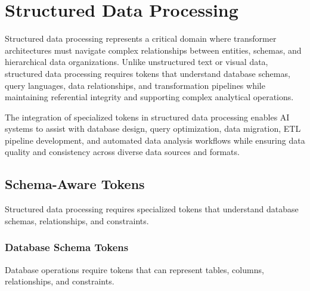 
\section{Structured Data Processing}

Structured data processing represents a critical domain where transformer architectures must navigate complex relationships between entities, schemas, and hierarchical data organizations. Unlike unstructured text or visual data, structured data processing requires tokens that understand database schemas, query languages, data relationships, and transformation pipelines while maintaining referential integrity and supporting complex analytical operations.

The integration of specialized tokens in structured data processing enables AI systems to assist with database design, query optimization, data migration, ETL pipeline development, and automated data analysis workflows while ensuring data quality and consistency across diverse data sources and formats.

\subsection{Schema-Aware Tokens}

Structured data processing requires specialized tokens that understand database schemas, relationships, and constraints.

\subsubsection{Database Schema Tokens}

Database operations require tokens that can represent tables, columns, relationships, and constraints.

